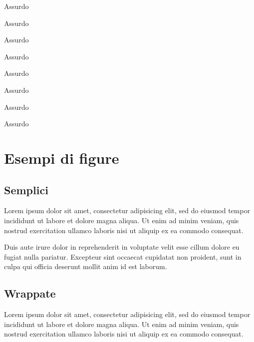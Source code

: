 \documentclass[a4paper, 12pt]{report}
\begin{document}
\begin{multicols*}{2}

\makebox[3cm][l]{\absurd} Assurdo

\makebox[3cm][l]{\absurd} Assurdo

\makebox[3cm][l]{\absurd} Assurdo

\makebox[3cm][l]{\absurd} Assurdo

\vfill\null\columnbreak

\makebox[3cm][l]{\absurd} Assurdo

\makebox[3cm][l]{\absurd} Assurdo

\makebox[3cm][l]{\absurd} Assurdo

\makebox[3cm][l]{\absurd} Assurdo

\end{multicols*}

\section*{Esempi di figure}

\subsection*{Semplici}

Lorem ipsum dolor sit amet, consectetur adipisicing elit, sed do eiusmod
tempor incididunt ut labore et dolore magna aliqua. Ut enim ad minim veniam,
quis nostrud exercitation ullamco laboris nisi ut aliquip ex ea commodo consequat.

\begin{figure}[h]
	\centering
\end{figure}

Duis aute irure dolor in reprehenderit in voluptate velit esse
cillum dolore eu fugiat nulla pariatur. Excepteur sint occaecat cupidatat non
proident, sunt in culpa qui officia deserunt mollit anim id est laborum.

\subsection*{Wrappate}

Lorem ipsum dolor sit amet, consectetur adipisicing elit, sed do eiusmod
tempor incididunt ut labore et dolore magna aliqua. Ut enim ad minim veniam,
quis nostrud exercitation ullamco laboris nisi ut aliquip ex ea commodo consequat.
\end{document}
